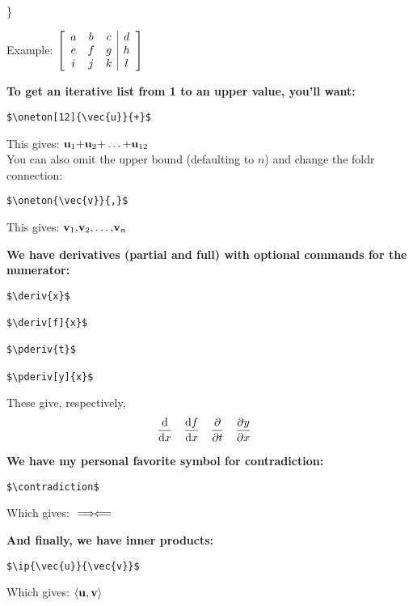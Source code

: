 \documentclass[12pt,letterpaper]{article}
\newcommand{\vertsp}{\vspace{0.4 in}}
\begin{document}
\}


Example: {\large{ $\augmatrix{ccc|c}{a & b & c & d \\ e & f & g & h \\ i & j & k & l}$}}
\vertsp


{\bf To get an iterative list from 1 to an upper value, you'll want:}
\begin{verbatim}
$\oneton[12]{\vec{u}}{+}$
\end{verbatim}
This gives: $\oneton[12]{\vec{u}}{+}$\\

You can also omit the upper bound (defaulting to $n$) and change the foldr connection:
\begin{verbatim}
$\oneton{\vec{v}}{,}$
\end{verbatim}
This gives: $\oneton{\vec{v}}{,}$

\vertsp

{\bf We have derivatives (partial and full) with optional commands for the numerator:}

\begin{verbatim}
$\deriv{x}$

$\deriv[f]{x}$

$\pderiv{t}$

$\pderiv[y]{x}$
\end{verbatim}
These give, respectively,
\begin{align*}
&\deriv{x} &
& \deriv[f]{x} &
\pderiv{t}&
& \pderiv[y]{x}&
\end{align*}
\vertsp


{\bf We have my personal favorite symbol for contradiction:}
\begin{verbatim}
$\contradiction$
\end{verbatim}
Which gives: $\contradiction$
\vertsp


{\bf And finally, we have inner products:}
\begin{verbatim}
$\ip{\vec{u}}{\vec{v}}$
\end{verbatim}
Which gives: $\ip{\vec{u}}{\vec{v}}$
\end{document}

